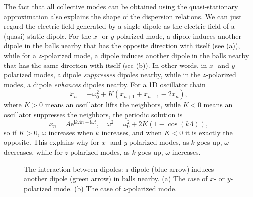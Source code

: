 \documentclass[hyperref, a4paper]{article}
\newcommand*{\ii}{\mathrm{i}}
\newcommand*{\ee}{\mathrm{e}}
\begin{document}
The fact that all collective modes can be obtained using the quasi-stationary approximation also explains the 
shape of the dispersion relations. We can just regard the electric field generated by a single dipole as the 
electric field of a (quasi)-static dipole. For the $x$- or $y$-polarized mode, a dipole induces another dipole 
in the balls nearby that has the opposite direction with itself (see (a)), while 
for a $z$-polarized mode, a dipole induces another dipole in the balls nearby that has the same direction with
itself (see (b)). In other words, in $x$- and $y$-polarized modes, a dipole 
\emph{suppresses} dipoles nearby, while in the $z$-polarized modes, a dipole \emph{enhances} dipoles nearby.
For a 1D oscillator chain 
\[
    \ddot{x}_n = - \omega_0^2 + K(x_{n+1} + x_{n-1} - 2 x_n),
\]
where $K > 0$ means an oscillator lifts the neighbors, while $K < 0$ means an oscillator suppresses the neighbors,
the periodic solution is 
\begin{equation}
    x_n = A \ee^{\ii k \Lambda n - \ii \omega t}, \quad \omega^2 = \omega_0^2 + 2K (1 - \cos (k \Lambda)),
\end{equation}
so if $K > 0$, $\omega$ increases when $k$ increases, and when $K<0$ it is exactly the opposite.
This explains why for $x$- and $y$-polarized modes, as $k$ goes up, $\omega$ decreases, while for $z$-polarized 
modes, as $k$ goes up, $\omega$ increases.

\begin{figure}
    \centering
    
    \caption{The interaction between dipoles: a dipole (blue arrow) induces another dipole (green arrow) in balls nearby. (a) The case of $x$- or $y$-polarized mode. (b) The case of $z$-polarized mode. }
    \label{fig:dipole-field}
\end{figure}
\end{document}
